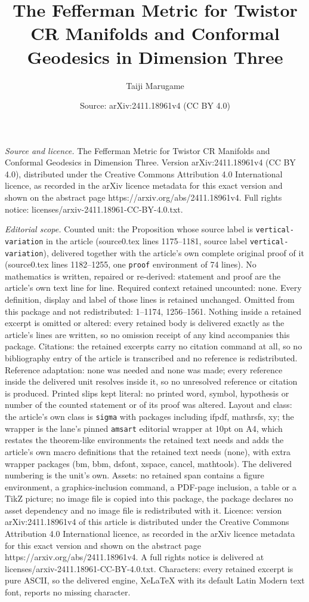 \documentclass[10pt,a4paper]{amsart}
\title[The Fefferman Metric for Twistor CR Manifolds and Conformal ]{The Fefferman Metric for Twistor CR Manifolds and Conformal Geodesics in Dimension Three}
\author{Taiji Marugame}
\date{Source: arXiv:2411.18961v4 (CC BY 4.0)}
\begin{document}
\maketitle

\noindent\emph{Source and licence.} The Fefferman Metric for Twistor CR Manifolds and Conformal Geodesics in Dimension Three. Version arXiv:2411.18961v4 (CC BY 4.0), distributed under the Creative Commons Attribution 4.0 International licence, as recorded in the arXiv licence metadata for this exact version and shown on the abstract page https://arxiv.org/abs/2411.18961v4. Full rights notice: licenses/arxiv-2411.18961-CC-BY-4.0.txt.\par\smallskip

\noindent\textit{Editorial scope.} Counted unit: the Proposition whose source label is \texttt{vertical-variation} in the article (source0.tex lines 1175--1181, source label \texttt{vertical-variation}), delivered together with the article's own complete original proof of it (source0.tex lines 1182--1255, one \texttt{proof} environment of 74 lines). No mathematics is written, repaired or re-derived: statement and proof are the article's own text line for line. Required context retained uncounted: none. Every definition, display and label of those lines is retained unchanged. Omitted from this package and not redistributed: 1--1174, 1256--1561. Nothing inside a retained excerpt is omitted or altered: every retained body is delivered exactly as the article's lines are written, so no omission receipt of any kind accompanies this package. Citations: the retained excerpts carry no citation command at all, so no bibliography entry of the article is transcribed and no reference is redistributed. Reference adaptation: none was needed and none was made; every reference inside the delivered unit resolves inside it, so no unresolved reference or citation is produced. Printed slips kept literal: no printed word, symbol, hypothesis or number of the counted statement or of its proof was altered. Layout and class: the article's own class is \texttt{sigma} with packages including ifpdf, mathrsfs, xy; the wrapper is the lane's pinned \texttt{amsart} editorial wrapper at 10pt on A4, which restates the theorem-like environments the retained text needs and adds the article's own macro definitions that the retained text needs (none), with extra wrapper packages (bm, bbm, dsfont, xspace, cancel, mathtools). The delivered numbering is the unit's own. Assets: no retained span contains a figure environment, a graphics-inclusion command, a PDF-page inclusion, a table or a TikZ picture; no image file is copied into this package, the package declares no asset dependency and no image file is redistributed with it. Licence: version arXiv:2411.18961v4 of this article is distributed under the Creative Commons Attribution 4.0 International licence, as recorded in the arXiv licence metadata for this exact version and shown on the abstract page https://arxiv.org/abs/2411.18961v4. A full rights notice is delivered at licenses/arxiv-2411.18961-CC-BY-4.0.txt. Characters: every retained excerpt is pure ASCII, so the delivered engine, XeLaTeX with its default Latin Modern text font, reports no missing character.
\end{document}
